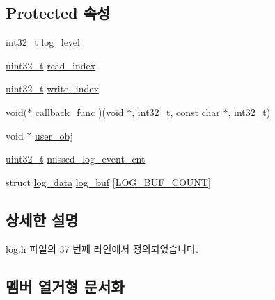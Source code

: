 \subsection*{Protected 속성}
\begin{DoxyCompactItemize}
\item 
\hyperlink{parse_8c_a37994e3b11c72957c6f454c6ec96d43d}{int32\+\_\+t} \hyperlink{classavdecc__lib_1_1log_aa07e39131a3e0ab9ffd691b0f455134d}{log\+\_\+level}
\item 
\hyperlink{parse_8c_a6eb1e68cc391dd753bc8ce896dbb8315}{uint32\+\_\+t} \hyperlink{classavdecc__lib_1_1log_a2ccf0f8cb3b20ac18cc9c7bcff1084ad}{read\+\_\+index}
\item 
\hyperlink{parse_8c_a6eb1e68cc391dd753bc8ce896dbb8315}{uint32\+\_\+t} \hyperlink{classavdecc__lib_1_1log_a44d246646acf5f95a78a87d606f22a42}{write\+\_\+index}
\item 
void($\ast$ \hyperlink{classavdecc__lib_1_1log_a1e4db5370768bd861a59049d170732bd}{callback\+\_\+func} )(void $\ast$, \hyperlink{parse_8c_a37994e3b11c72957c6f454c6ec96d43d}{int32\+\_\+t}, const char $\ast$, \hyperlink{parse_8c_a37994e3b11c72957c6f454c6ec96d43d}{int32\+\_\+t})
\item 
void $\ast$ \hyperlink{classavdecc__lib_1_1log_af3646c45b560aeab38e708886dec0d93}{user\+\_\+obj}
\item 
\hyperlink{parse_8c_a6eb1e68cc391dd753bc8ce896dbb8315}{uint32\+\_\+t} \hyperlink{classavdecc__lib_1_1log_a3ab71103159d076fcb40d836993a59bc}{missed\+\_\+log\+\_\+event\+\_\+cnt}
\item 
struct \hyperlink{structavdecc__lib_1_1log_1_1log__data}{log\+\_\+data} \hyperlink{classavdecc__lib_1_1log_a2a5ef536ff60c1a9a38f36c0df2f38da}{log\+\_\+buf} \mbox{[}\hyperlink{classavdecc__lib_1_1log_adf764cbdea00d65edcd07bb9953ad2b7a46b4b58fe7f3d2ff3dc4e8f781261727}{L\+O\+G\+\_\+\+B\+U\+F\+\_\+\+C\+O\+U\+NT}\mbox{]}
\end{DoxyCompactItemize}


\subsection{상세한 설명}


log.\+h 파일의 37 번째 라인에서 정의되었습니다.



\subsection{멤버 열거형 문서화}
